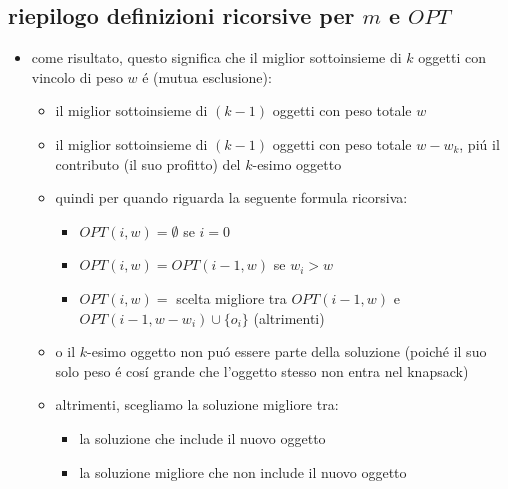 \subsection*{riepilogo definizioni ricorsive per $m$ e $OPT$}
\begin{flushleft}
	\begin{itemize}
		\item come risultato, questo significa che il miglior sottoinsieme di $k$ oggetti con vincolo di peso $w$ \'e (mutua esclusione):
		\begin{itemize}
			\item il miglior sottoinsieme di $(k-1)$ oggetti con peso totale $w$
			\item il miglior sottoinsieme di $(k-1)$ oggetti con peso totale $w-w_k$, pi\'u il contributo (il suo profitto) del $k$-esimo oggetto
			\item quindi per quando riguarda la seguente formula ricorsiva:
			\begin{itemize}
				\item $OPT(i,w)=\emptyset$ se $i=0$
				\item $OPT(i,w)=OPT(i-1,w)$ se $w_i>w$
				\item $OPT(i,w)=$ scelta migliore tra $OPT(i-1,w)$ e $OPT(i-1,w-w_i)\cup\{o_i\}$ (altrimenti)
			\end{itemize}
		\item o il $k$-esimo oggetto non pu\'o essere parte della soluzione (poich\'e il suo solo peso \'e cos\'i grande che l'oggetto stesso non entra nel knapsack)
		\item altrimenti, scegliamo la soluzione migliore tra:
		\begin{itemize}
			\item la soluzione che include il nuovo oggetto
			\item la soluzione migliore che non include il nuovo oggetto
		\end{itemize}
		\end{itemize}
	\end{itemize}
\end{flushleft}


